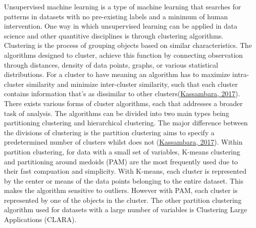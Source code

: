 \documentclass[11pt,preprint, authoryear]{elsarticle}
\numberwithin{equation}{section}
\numberwithin{figure}{section}
\numberwithin{table}{section}
\begin{document}
Unsupervised machine learning is a type of machine learning that
searches for patterns in datasets with no pre-existing labels and a
minimum of human intervention. One way in which unsupervised learning
can be applied in data science and other quantitive disciplines is
through clustering algorithms. Clustering is the process of grouping
objects based on similar characteristics. The algorithms designed to
cluster, achieve this function by connecting observation through
distances, density of data points, graphs, or various statistical
distributions. For a cluster to have meaning an algorithm has to
maximize intra-cluster similarity and minimize inter-cluster similarity,
such that each cluster contains information that's as dissimilar to
other
clusters(\protect\hyperlink{ref-kassambara2017practical}{Kassambara,
2017}). There exists various forms of cluster algorithms, each that
addresses a broader task of analysis. The algorithms can be divided into
two main types being partitioning clustering and hierarchical
clustering. The major difference between the divisions of clustering is
the partition clustering aims to specify a predetermined number of
clusters whilst does not
(\protect\hyperlink{ref-kassambara2017practical}{Kassambara, 2017}).
Within partition clustering, for data with a small set of variables,
K-means clustering and partitioning around medoids (PAM) are the most
frequently used due to their fast compuation and simplicity. With
K-means, each cluster is represented by the center or means of the data
points belonging to the entire dataset. This makes the algorithm
sensitive to outliers. However with PAM, each cluster is represented by
one of the objects in the cluster. The other partition clustering
algorithm used for datasets with a large number of variables is
Clustering Large Applications (CLARA).
\end{document}
